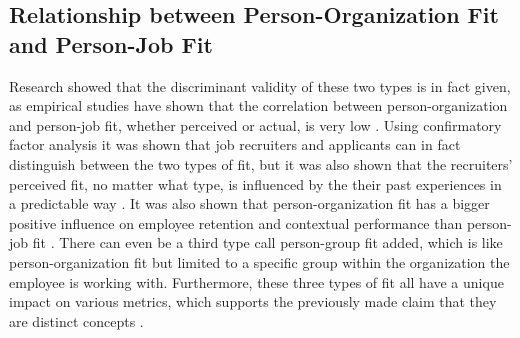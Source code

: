 \documentclass[draft,final]{thesisclass} %
\begin{document}
\subsection{Relationship between Person-Organization Fit and Person-Job Fit}
Research showed that the discriminant validity of these two types is in fact given, as empirical studies have shown that the correlation between person-organization and person-job fit, whether perceived or actual, is very low \parencite[185]{po_and_pj_fit_literature_review}.
Using confirmatory factor analysis it was shown that job recruiters and applicants can in fact distinguish between the two types of fit, but it was also shown that the recruiters' perceived fit, no matter what type, is influenced by the their past experiences in a predictable way \parencite[185]{po_and_pj_fit_literature_review}.
It was also shown that person-organization fit has a bigger positive influence on employee retention and contextual performance than person-job fit \parencite[185]{po_and_pj_fit_literature_review}.
There can even be a third type call person-group fit added, which is like person-organization fit but limited to a specific group within the organization the employee is working with.
Furthermore, these three types of fit all have a unique impact on various metrics, which supports the previously made claim that they are distinct concepts \parencite[185]{po_and_pj_fit_literature_review}.
\end{document}
